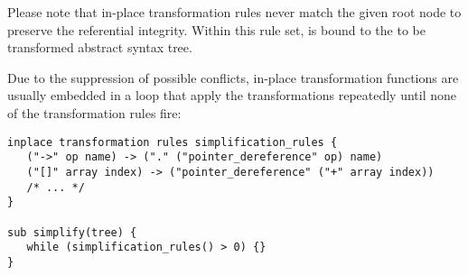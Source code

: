 Please note that in-place transformation rules never match the
given root node to preserve the referential integrity.
Within this rule set,  is bound to the
to be transformed abstract syntax tree.

\begin{grammar}
      \produces {}
	  
	  \nextline
	 \lextoken{\{} 
	 \lextoken{\}}
\end{grammar}

Due to the suppression of possible conflicts, in-place
transformation functions are usually embedded in a loop
that apply the transformations repeatedly until none
of the transformation rules fire:

\begin{lstlisting}
inplace transformation rules simplification_rules {
   ("->" op name) -> ("." ("pointer_dereference" op) name)
   ("[]" array index) -> ("pointer_dereference" ("+" array index))
   /* ... */
}

sub simplify(tree) {
   while (simplification_rules() > 0) {}
}
\end{lstlisting}

\endinput
